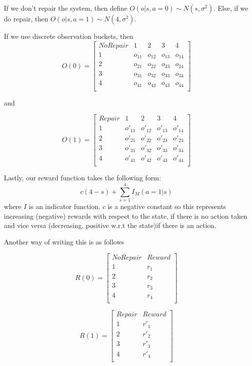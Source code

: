 \documentclass[english]{article}
\numberwithin{equation}{section}
\begin{document}
If we don't repair the system, then define $O(o|s,a=0) \sim N(s,\sigma^2)$. Else, if we do repair, then $O(o|s,a=1) \sim N(4,\sigma^2)$.

If we use discrete observation buckets, then 
$$    O(0) = 
\begin{bmatrix}
	No Repair & 1 & 2 & 3 & 4 \\
	1 & o_{11} & o_{12} & o_{13} & o_{14} \\
	2 & o_{21} & o_{22} & o_{23} & o_{24} \\
	3 & o_{31} & o_{32} & o_{33} & o_{34} \\
	4 & o_{41} & o_{42} & o_{43} & o_{44} \\
	\end{bmatrix}
$$

and

$$    O(1) = 
\begin{bmatrix}
Repair & 1 & 2 & 3 & 4 \\
1 & o'_{11} & o'_{12} & o'_{13} & o'_{14} \\
2 & o'_{21} & o'_{22} & o'_{23} & o'_{24} \\
3 & o'_{31} & o'_{32} & o'_{33} & o'_{34} \\
4 & o'_{41} & o'_{42} & o'_{43} & o'_{44} \\
\end{bmatrix}
$$

Lastly, our reward function takes the following form:
$$c(4-s) + \sum_{s=1}^4 I_M(a=1|s)$$ where $I$ is an indicator function. $c$ is a negative constant so this represents increasing (negative) rewards with respect to the state, if there is no action taken and vice versa (decreasing, positive w.r.t the state)if there is an action.

Another way of writing this is as follows

$$
R(0) = 
\begin{bmatrix}
	No Repair & Reward \\
	1 & r_1 \\
	2 & r_2 \\
	3 & r_3 \\
	4 & r_4 \\
	\end{bmatrix}
$$

$$
R(1) = 
\begin{bmatrix}
Repair & Reward \\
1 & r'_1 \\
2 & r'_2 \\
3 & r'_3 \\
4 & r'_4 \\
\end{bmatrix}
$$
\end{document}

